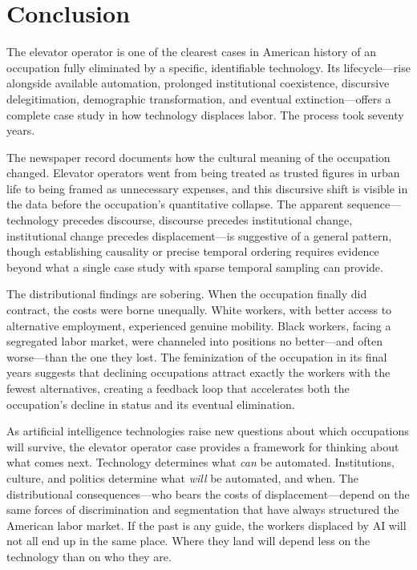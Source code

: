 \documentclass[12pt]{article}
\begin{document}

\section{Conclusion} \label{sec:conclusion}

The elevator operator is one of the clearest cases in American history of an occupation fully eliminated by a specific, identifiable technology. Its lifecycle---rise alongside available automation, prolonged institutional coexistence, discursive delegitimation, demographic transformation, and eventual extinction---offers a complete case study in how technology displaces labor. The process took seventy years.

The newspaper record documents how the cultural meaning of the occupation changed. Elevator operators went from being treated as trusted figures in urban life to being framed as unnecessary expenses, and this discursive shift is visible in the data before the occupation's quantitative collapse. The apparent sequence---technology precedes discourse, discourse precedes institutional change, institutional change precedes displacement---is suggestive of a general pattern, though establishing causality or precise temporal ordering requires evidence beyond what a single case study with sparse temporal sampling can provide.

The distributional findings are sobering. When the occupation finally did contract, the costs were borne unequally. White workers, with better access to alternative employment, experienced genuine mobility. Black workers, facing a segregated labor market, were channeled into positions no better---and often worse---than the one they lost. The feminization of the occupation in its final years suggests that declining occupations attract exactly the workers with the fewest alternatives, creating a feedback loop that accelerates both the occupation's decline in status and its eventual elimination.

As artificial intelligence technologies raise new questions about which occupations will survive, the elevator operator case provides a framework for thinking about what comes next. Technology determines what \emph{can} be automated. Institutions, culture, and politics determine what \emph{will} be automated, and when. The distributional consequences---who bears the costs of displacement---depend on the same forces of discrimination and segmentation that have always structured the American labor market. If the past is any guide, the workers displaced by AI will not all end up in the same place. Where they land will depend less on the technology than on who they are.
\end{document}
